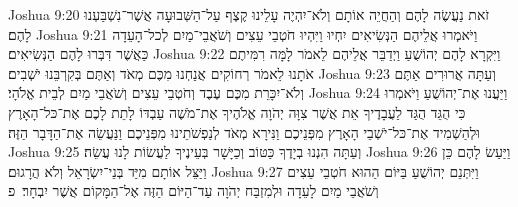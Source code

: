 Joshua 9:20	זֹאת נַעֲשֶׂה לָהֶם וְהַחֲיֵה אוֹתָם וְלֹא־יִהְיֶה עָלֵינוּ קֶצֶף עַל־הַשְּׁבוּעָה אֲשֶׁר־נִשְׁבַּעְנוּ לָהֶם׃
Joshua 9:21	וַיֹּאמְרוּ אֲלֵיהֶם הַנְּשִׂיאִים יִחְיוּ וַיִּהְיוּ חֹטְבֵי עֵצִים וְשֹׁאֲבֵי־מַיִם לְכל־הָעֵדָה כַּאֲשֶׁר דִּבְּרוּ לָהֶם הַנְּשִׂיאִים׃
Joshua 9:22	וַיִּקְרָא לָהֶם יְהוֹשֻׁעַ וַיְדַבֵּר אֲלֵיהֶם לֵאמֹר לָמָּה רִמִּיתֶם אֹתָנוּ לֵאמֹר רְחוֹקִים אֲנַחְנוּ מִכֶּם מְאֹד וְאַתֶּם בְּקִרְבֵּנוּ יֹשְׁבִים׃
Joshua 9:23	וְעַתָּה אֲרוּרִים אַתֶּם וְלֹא־יִכָּרֵת מִכֶּם עֶבֶד וְחֹטְבֵי עֵצִים וְשֹׁאֲבֵי מַיִם לְבֵית אֱלֹהָי׃
Joshua 9:24	וַיַּעֲנוּ אֶת־יְהוֹשֻׁעַ וַיֹּאמְרוּ כִּי הֻגֵּד הֻגַּד לַעֲבָדֶיךָ אֵת אֲשֶׁר צִוָּה יְהֹוָה אֱלֹהֶיךָ אֶת־מֹשֶׁה עַבְדּוֹ לָתֵת לָכֶם אֶת־כּל־הָאָרֶץ וּלְהַשְׁמִיד אֶת־כּל־יֹשְׁבֵי הָאָרֶץ מִפְּנֵיכֶם וַנִּירָא מְאֹד לְנַפְשֹׁתֵינוּ מִפְּנֵיכֶם וַנַּעֲשֵׂה אֶת־הַדָּבָר הַזֶּה׃
Joshua 9:25	וְעַתָּה הִנְנוּ בְיָדֶךָ כַּטּוֹב וְכַיָּשָׁר בְּעֵינֶיךָ לַעֲשׂוֹת לָנוּ עֲשֵׂה׃
Joshua 9:26	וַיַּעַשׂ לָהֶם כֵּן וַיַּצֵּל אוֹתָם מִיַּד בְּנֵי־יִשְׂרָאֵל וְלֹא הֲרָגוּם׃
Joshua 9:27	וַיִּתְּנֵם יְהוֹשֻׁעַ בַּיּוֹם הַהוּא חֹטְבֵי עֵצִים וְשֹׁאֲבֵי מַיִם לָעֵדָה וּלְמִזְבַּח יְהֹוָה עַד־הַיּוֹם הַזֶּה אֶל־הַמָּקוֹם אֲשֶׁר יִבְחָר׃ {פ}
